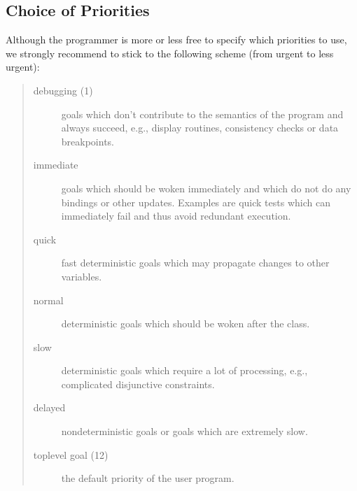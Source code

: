 \subsection{Choice of Priorities}
Although the programmer is more or less free to specify
which priorities to use, we strongly recommend
to stick to the following scheme (from urgent to less urgent):
\begin{quote}
\begin{description}
\item [debugging (1)]  goals which don't contribute to the semantics
of the program and always succeed, e.g., display routines, consistency
checks or data breakpoints.

\item [immediate]  goals which should be woken immediately
and which do not do any bindings or other updates.
Examples are quick tests which can immediately fail and
thus avoid redundant execution.

\item [quick]  fast deterministic goals which may
propagate changes to other variables.

\item [normal]  deterministic goals which should be woken
after the  class.

\item [slow]  deterministic goals which require
a lot of processing, e.g., complicated disjunctive
constraints.

\item [delayed]  nondeterministic goals
or goals which are extremely slow.

\item [toplevel goal (12)]  the default priority of the user program.
\end{description}
\end{quote}




